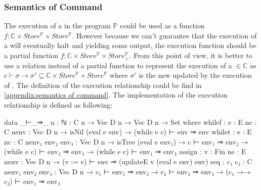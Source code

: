 \subsubsection{Semantics of Command}
The execution of a  in the program $\mathds{P}$ could be used as a function $f : \mathds{C} \times Store^{\mathds{P}} \times Store^{\mathds{P}}$.
However because we can't guarantee that the execution of a  will eventually halt and yielding some output, the execution function should be a partial function $f : \mathds{C} \times Store^{\mathds{P}} \times Store^{\mathds{P}}_\bot$.
From this point of view, it is better to use a relation instead of a partial function to represent the execution of a   $\in \mathds{C}$ as $c \vdash \sigma \rightarrow \sigma' \subseteq \mathds{C} \times Store^{\mathds{P}} \times Store^{\mathds{P}}$ where $\sigma'$ is the new  updated by the execution of  .
The definition of the execution  relationship could be find in \ref{appendix:semantics of command}.
The \Agda implementation of the execution relationship is defined as following:
\begin{code}[fontsize=\footnotesize]
data _⊢_⇒_ {n : ℕ} : C n → Vec D n  → Vec D n → Set where
  whilef : {e : E n}{c : C n}{env : Vec D n}
         → isNil (eval e env)
         → (while e c) ⊢ env ⇒ env
  whilet : {e : E n}{c : C n}{env₁ env₂ env₃ : Vec D n}
         → isTree (eval e env₁)
         → c ⊢ env₁ ⇒ env₂
         → (while e c) ⊢ env₂ ⇒ env₃
         → (while e c) ⊢ env₁ ⇒ env₃
  assign : {v : Fin n}{e : E n}{env : Vec D n}
         → (v := e) ⊢ env ⇒ (updateE v (eval e env) env)
  seq    : {c₁ c₂ : C n}{env₁ env₂ env₃ : Vec D n}
         → c₁ ⊢ env₁ ⇒ env₂
         → c₂ ⊢ env₂ ⇒ env₃
         → (c₁ →→ c₂) ⊢ env₁ ⇒ env₃
\end{code}
